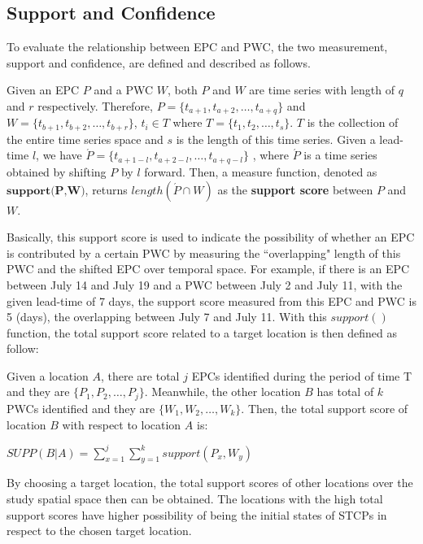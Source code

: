 \documentclass{acm_proc_article-sp}
\begin{document}
\subsection{Support and Confidence}
\label{sec:support}
To evaluate the relationship between EPC and PWC, the two measurement, support and confidence, are defined and described as follows.  
\begin{mydef}
\label{def:suportfunction}
Given an EPC $P$ and a PWC $W$, both $P$ and $W$ are time series with length of $q$ and $r$ respectively. Therefore, $P = \{ t_{a+1}, t_{a+2}, \ldots , t_{a+q} \} $ and \\
$W = \{ t_{b+1}, t_{b+2}, \ldots , t_{b+r} \}$,  $t_i \in T$ where $T = \{ t_1, t_2, \ldots , t_s \} $. $T$ is the collection of the entire time series space and $s$ is the length of this time series.
\newline 
Given a lead-time $l$, we have $\acute{P} = \{ t_{a+1-l}, t_{a+2-l}, \ldots , t_{a+q-l} \} $ , where $\acute{P}$ is a time series obtained by shifting $P$ by $l$ forward. Then, a measure function, denoted as $\textbf{support(P,W)}$, returns $length(\acute{P} \cap W)$ as the \textbf{support score} between $P$ and $W$.
\end{mydef} 
Basically, this support score is used to indicate the possibility of whether an EPC is contributed by a certain PWC by measuring the ``overlapping" length of this PWC and the shifted EPC over temporal space. For example, if there is an EPC between July 14 and July 19 and a PWC between July 2 and July 11, with the given lead-time of 7 days, the support score measured from this EPC and PWC is 5 (days), the overlapping between July 7 and July 11.
\newline
With this $support()$ function, the total support score related to a target location is then defined as follow:
\begin{mydef}
\label{def:totalsuport}
Given a location $A$, there are total $j$ EPCs identified during the period of time T and they are $\{ P_1 , P_2 , \ldots , P_j \}$. Meanwhile, the other location $B$ has total of $k$ PWCs identified and they are $\{ W_1 , W_2 , \ldots , W_k \}$. Then, the total support score of location $B$ with respect to location $A$ is: 
\begin{center}
    $SUPP(B|A)=\sum_{x=1}^{j} \sum_{y=1}^{k} support(P_x,W_y) $
\end{center}
\end{mydef}
By choosing a target location, the total support scores of other locations over the study spatial space then can be obtained. The locations with the high total support scores have higher possibility of being the initial states of STCPs in respect to the chosen target location. 
\end{document}
